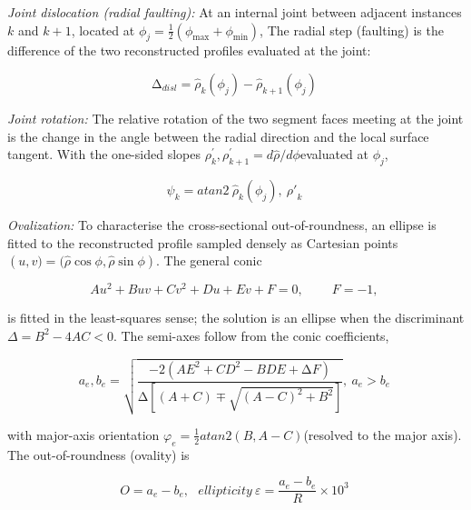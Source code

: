 \documentclass[preprint,12pt,authoryear]{elsarticle}
\begin{document}
\emph{Joint dislocation (radial faulting):} At an internal joint between
adjacent instances \(k\) and \(k + 1\), located at
\(\phi_{j} = \frac{1}{2}(\phi_{\max}^{} + \phi_{\min}^{})\), The radial
step (faulting) is the difference of the two reconstructed profiles
evaluated at the joint:

\begin{equation}
  \mathrm{\Delta}_{disl} = {\widehat{\rho}}_{k}\left( \phi_{j} \right) - {\widehat{\rho}}_{k + 1}\left( \phi_{j} \right)\
  \label{eq:19}
\end{equation}

\emph{Joint rotation:} The relative rotation of the two segment faces
meeting at the joint is the change in the angle between the radial
direction and the local surface tangent. With the one-sided slopes
\(\rho_{k}^{'},\rho_{k + 1}^{'} = d\widehat{\rho}/d\phi\)evaluated at
\(\phi_{j}\),

\begin{equation}
  \psi_{k} = {atan}{2\ {\widehat{\rho}}_{k}\left( \phi_{j} \right),\ {\rho'}_{k}}\
  \label{eq:20}
\end{equation}

\emph{Ovalization:} To characterise the cross-sectional
out-of-roundness, an ellipse is fitted to the reconstructed profile
sampled densely as Cartesian points
\(\left( u,v) = (\widehat{\rho}\cos\phi,\widehat{\rho}\sin\phi \right)\).
The general conic

\begin{equation}
  Au^{2} + Buv + Cv^{2} + Du + Ev + F = 0,\ \ \ \ \ \ \ \ \ \ F = - 1,\
  \label{eq:21}
\end{equation}

is fitted in the least-squares sense; the solution is an ellipse when
the discriminant \(\Delta = B^{2} - 4AC < 0\). The semi-axes follow from
the conic coefficients,

\begin{equation}
  a_{e},b_{e} = \sqrt{\frac{- 2\left( {AE}^{2} + {CD}^{2} - BDE + \mathrm{\Delta}F \right)}{\mathrm{\Delta}\left\lbrack (A + C) \mp \sqrt{(A - C)^{2} + B^{2}} \right\rbrack}},\ a_{e} > b_{e}\
  \label{eq:22}
\end{equation}

with major-axis orientation
\(\varphi_{e} = \frac{1}{2}atan2(B,\text{}A - C)\)(resolved to the
major axis). The out-of-roundness (ovality) is

\begin{equation}
  O = a_{e} - b_{e},\ \ \ ellipticity\ \varepsilon = \frac{a_{e} - b_{e}}{R} \times 10^{3}\
  \label{eq:23}
\end{equation}
\end{document}
